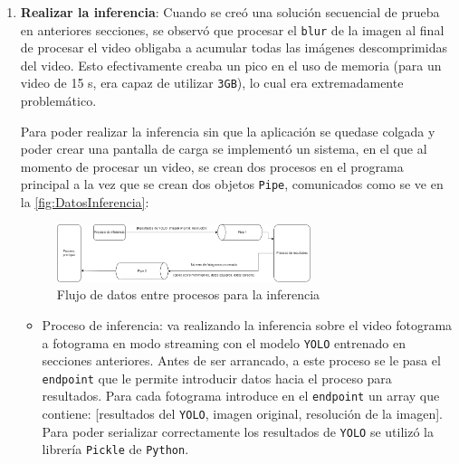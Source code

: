 \begin{enumerate}
    \item \textbf{Realizar la inferencia}:\newline
    Cuando se creó una solución secuencial de prueba en anteriores secciones, se observó que procesar el \texttt{blur} de la imagen al final de procesar el video obligaba a acumular todas las imágenes 
    descomprimidas del video. Esto efectivamente creaba un pico en el uso de memoria  (para un video de 15 s, era capaz de utilizar \texttt{3GB}), lo cual era extremadamente problemático.

    Para poder realizar la inferencia sin que la aplicación se quedase colgada y poder crear una pantalla de carga se implementó un sistema, en el que al momento de procesar un video, se crean dos procesos 
    en el programa principal a la vez que se crean dos objetos \texttt{Pipe}, comunicados como se ve en la \autoref{fig:DatosInferencia}:
    \begin{figure}[H]
        \centering
        \includegraphics[width=0.7\textwidth]{images/6/6.5/Procesos1.png}
        \caption{Flujo de datos entre procesos para la inferencia}
        \label{fig:DatosInferencia}
    \end{figure}
    \vspace{2\baselineskip}
    \begin{itemize}
        \item Proceso de inferencia: va realizando la inferencia sobre el video fotograma a fotograma en modo streaming con el modelo \texttt{YOLO} entrenado en secciones anteriores. Antes de ser arrancado, 
        a este proceso se le pasa el \texttt{endpoint} que le permite introducir datos hacia el proceso para resultados. Para cada fotograma introduce en el \texttt{endpoint} un array que contiene: 
        [resultados del \texttt{YOLO}, imagen original, resolución de la imagen]. Para poder serializar correctamente los resultados de \texttt{YOLO} se utilizó la librería \texttt{Pickle} de \texttt{Python}.
        

\end{itemize}
\end{enumerate}
